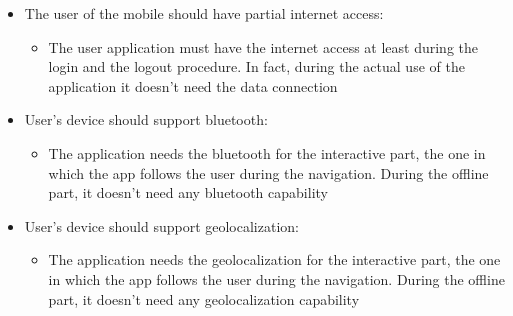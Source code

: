 \begin{itemize}
	\item The user of the mobile should have partial internet access:
	\begin{itemize}
		\item The user application must have the internet access at least during the login and the logout procedure. In fact, during the actual use of the application it doesn't need the data connection
	\end{itemize}
	\item User's device should support bluetooth:
	\begin{itemize}
		\item The application needs the bluetooth for the interactive part, the one in which the app follows the user during the navigation. During the offline part, it doesn't need any bluetooth capability
	\end{itemize}
	\item User's device should support geolocalization:
	\begin{itemize}
		\item The application needs the geolocalization for the interactive part, the one in which the app follows the user during the navigation. During the offline part, it doesn't need any geolocalization capability
	\end{itemize}
\end{itemize}